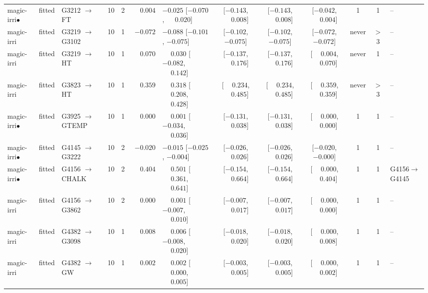 \begin{landscape}
\begin{longtable}{@{}llp{2.15cm}ccrl cccc c l@{}}
magic-irri$\bullet$ & fitted & G3212 $\to$ FT & 10 & 2 & $\phantom{-}0.004$ & $-0.025$ [$-0.070$, $\phantom{-}0.020$] & [$-0.143$, $\phantom{-}0.008$] & [$-0.143$, $\phantom{-}0.008$] & [$-0.042$, $\phantom{-}0.004$] & 1 & 1 & -- \\
magic-irri & fitted & G3219 $\to$ G3102 & 10 & 1 & $-0.072$ & $-0.088$ [$-0.101$, $-0.075$] & [$-0.102$, $-0.075$] & [$-0.102$, $-0.075$] & [$-0.072$, $-0.072$] & never & $>$3 & -- \\
magic-irri & fitted & G3219 $\to$ HT & 10 & 1 & $\phantom{-}0.070$ & $\phantom{-}0.030$ [$-0.082$, $\phantom{-}0.142$] & [$-0.137$, $\phantom{-}0.176$] & [$-0.137$, $\phantom{-}0.176$] & [$\phantom{-}0.004$, $\phantom{-}0.070$] & never & 1 & -- \\
magic-irri & fitted & G3823 $\to$ HT & 10 & 1 & $\phantom{-}0.359$ & $\phantom{-}0.318$ [$\phantom{-}0.208$, $\phantom{-}0.428$] & [$\phantom{-}0.234$, $\phantom{-}0.485$] & [$\phantom{-}0.234$, $\phantom{-}0.485$] & [$\phantom{-}0.359$, $\phantom{-}0.359$] & never & $>$3 & -- \\
magic-irri$\bullet$ & fitted & G3925 $\to$ GTEMP & 10 & 1 & $\phantom{-}0.000$ & $\phantom{-}0.001$ [$-0.034$, $\phantom{-}0.036$] & [$-0.131$, $\phantom{-}0.038$] & [$-0.131$, $\phantom{-}0.038$] & [$\phantom{-}0.000$, $\phantom{-}0.000$] & 1 & 1 & -- \\
magic-irri$\bullet$ & fitted & G4145 $\to$ G3222 & 10 & 2 & $-0.020$ & $-0.015$ [$-0.025$, $-0.004$] & [$-0.026$, $\phantom{-}0.026$] & [$-0.026$, $\phantom{-}0.026$] & [$-0.020$, $-0.000$] & 1 & 1 & -- \\
magic-irri$\bullet$ & fitted & G4156 $\to$ CHALK & 10 & 2 & $\phantom{-}0.404$ & $\phantom{-}0.501$ [$\phantom{-}0.361$, $\phantom{-}0.641$] & [$-0.154$, $\phantom{-}0.664$] & [$-0.154$, $\phantom{-}0.664$] & [$\phantom{-}0.000$, $\phantom{-}0.404$] & 1 & 1 & G4156$\to$G4145 \\
magic-irri & fitted & G4156 $\to$ G3862 & 10 & 2 & $\phantom{-}0.000$ & $\phantom{-}0.001$ [$-0.007$, $\phantom{-}0.010$] & [$-0.007$, $\phantom{-}0.017$] & [$-0.007$, $\phantom{-}0.017$] & [$\phantom{-}0.000$, $\phantom{-}0.000$] & 1 & 1 & -- \\
magic-irri & fitted & G4382 $\to$ G3098 & 10 & 1 & $\phantom{-}0.008$ & $\phantom{-}0.006$ [$-0.008$, $\phantom{-}0.020$] & [$-0.018$, $\phantom{-}0.020$] & [$-0.018$, $\phantom{-}0.020$] & [$\phantom{-}0.000$, $\phantom{-}0.008$] & 1 & 1 & -- \\
magic-irri & fitted & G4382 $\to$ GW & 10 & 1 & $\phantom{-}0.002$ & $\phantom{-}0.002$ [$\phantom{-}0.000$, $\phantom{-}0.005$] & [$-0.003$, $\phantom{-}0.005$] & [$-0.003$, $\phantom{-}0.005$] & [$\phantom{-}0.000$, $\phantom{-}0.002$] & 1 & 1 & -- \\

\end{longtable}
\end{landscape}
